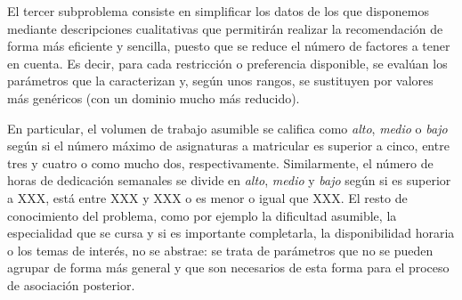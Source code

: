 El tercer subproblema consiste en simplificar los datos de los que disponemos 
mediante descripciones cualitativas que permitirán realizar la recomendación 
de forma más eficiente y sencilla, puesto que se reduce el número de factores 
a tener en cuenta. Es decir, para cada restricción o preferencia disponible, 
se evalúan los parámetros que la caracterizan y, según unos rangos, se 
sustituyen por valores más genéricos (con un dominio mucho más reducido). 

En particular, el volumen de trabajo asumible se califica como \textit{alto}, 
\textit{medio} o \textit{bajo} según si el número máximo de asignaturas a 
matricular es superior a cinco, entre tres y cuatro o como mucho dos, 
respectivamente. Similarmente, el número de horas de dedicación semanales se 
divide en \textit{alto}, \textit{medio} y \textit{bajo} según si es superior 
a XXX, está entre XXX y XXX o es menor o igual que XXX. 
El resto de conocimiento del problema, como por ejemplo la dificultad 
asumible, la especialidad que se cursa y si es importante completarla, la 
disponibilidad horaria o los temas de interés, no se abstrae: se trata de 
parámetros que no se pueden agrupar de forma más general y que son necesarios 
de esta forma para el proceso de asociación posterior.




